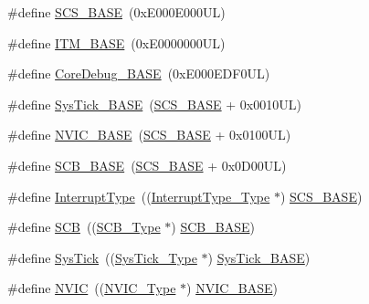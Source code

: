 \begin{DoxyCompactItemize}
\item 
\#define \hyperlink{group___c_m_s_i_s__core__register_ga3c14ed93192c8d9143322bbf77ebf770}{\-S\-C\-S\-\_\-\-B\-A\-S\-E}~(0x\-E000\-E000\-U\-L)
\item 
\#define \hyperlink{group___c_m_s_i_s__core__register_gadd76251e412a195ec0a8f47227a8359e}{\-I\-T\-M\-\_\-\-B\-A\-S\-E}~(0x\-E0000000\-U\-L)
\item 
\#define \hyperlink{group___c_m_s_i_s__core__register_ga680604dbcda9e9b31a1639fcffe5230b}{\-Core\-Debug\-\_\-\-B\-A\-S\-E}~(0x\-E000\-E\-D\-F0\-U\-L)
\item 
\#define \hyperlink{group___c_m_s_i_s__core__register_ga58effaac0b93006b756d33209e814646}{\-Sys\-Tick\-\_\-\-B\-A\-S\-E}~(\hyperlink{group___c_m_s_i_s__core__register_ga3c14ed93192c8d9143322bbf77ebf770}{\-S\-C\-S\-\_\-\-B\-A\-S\-E} +  0x0010\-U\-L)
\item 
\#define \hyperlink{group___c_m_s_i_s__core__register_gaa0288691785a5f868238e0468b39523d}{\-N\-V\-I\-C\-\_\-\-B\-A\-S\-E}~(\hyperlink{group___c_m_s_i_s__core__register_ga3c14ed93192c8d9143322bbf77ebf770}{\-S\-C\-S\-\_\-\-B\-A\-S\-E} +  0x0100\-U\-L)
\item 
\#define \hyperlink{group___c_m_s_i_s__core__register_gad55a7ddb8d4b2398b0c1cfec76c0d9fd}{\-S\-C\-B\-\_\-\-B\-A\-S\-E}~(\hyperlink{group___c_m_s_i_s__core__register_ga3c14ed93192c8d9143322bbf77ebf770}{\-S\-C\-S\-\_\-\-B\-A\-S\-E} +  0x0\-D00\-U\-L)
\item 
\#define \hyperlink{group___c_m_s_i_s__core__register_ga164238adbad56f07c7dd4e912af748dd}{\-Interrupt\-Type}~((\hyperlink{struct_interrupt_type___type}{\-Interrupt\-Type\-\_\-\-Type} $\ast$) \hyperlink{group___c_m_s_i_s__core__register_ga3c14ed93192c8d9143322bbf77ebf770}{\-S\-C\-S\-\_\-\-B\-A\-S\-E})
\item 
\#define \hyperlink{group___c_m_s_i_s__core__register_gaaaf6477c2bde2f00f99e3c2fd1060b01}{\-S\-C\-B}~((\hyperlink{struct_s_c_b___type}{\-S\-C\-B\-\_\-\-Type} $\ast$)           \hyperlink{group___c_m_s_i_s__core__register_gad55a7ddb8d4b2398b0c1cfec76c0d9fd}{\-S\-C\-B\-\_\-\-B\-A\-S\-E})
\item 
\#define \hyperlink{group___c_m_s_i_s__core__register_gacd96c53beeaff8f603fcda425eb295de}{\-Sys\-Tick}~((\hyperlink{struct_sys_tick___type}{\-Sys\-Tick\-\_\-\-Type} $\ast$)       \hyperlink{group___c_m_s_i_s__core__register_ga58effaac0b93006b756d33209e814646}{\-Sys\-Tick\-\_\-\-B\-A\-S\-E})
\item 
\#define \hyperlink{group___c_m_s_i_s__core__register_gac8e97e8ce56ae9f57da1363a937f8a17}{\-N\-V\-I\-C}~((\hyperlink{struct_n_v_i_c___type}{\-N\-V\-I\-C\-\_\-\-Type} $\ast$)          \hyperlink{group___c_m_s_i_s__core__register_gaa0288691785a5f868238e0468b39523d}{\-N\-V\-I\-C\-\_\-\-B\-A\-S\-E})

\end{DoxyCompactItemize}
